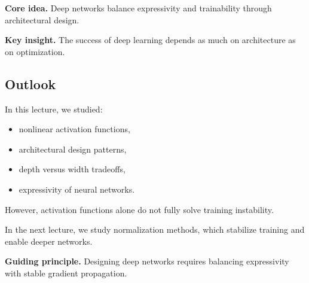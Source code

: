 \medskip

\noindent
\textbf{Core idea.}  
Deep networks balance expressivity and trainability through architectural design.

\medskip

\noindent
\textbf{Key insight.}  
The success of deep learning depends as much on architecture as on optimization.

\subsection{Outlook}

In this lecture, we studied:

\begin{itemize}
    \item nonlinear activation functions,
    \item architectural design patterns,
    \item depth versus width tradeoffs,
    \item expressivity of neural networks.
\end{itemize}

\medskip

\noindent
However, activation functions alone do not fully solve training instability.

\medskip

\noindent
In the next lecture, we study normalization methods, which stabilize training and enable deeper networks.

\medskip

\noindent
\textbf{Guiding principle.}  
Designing deep networks requires balancing expressivity with stable gradient propagation.